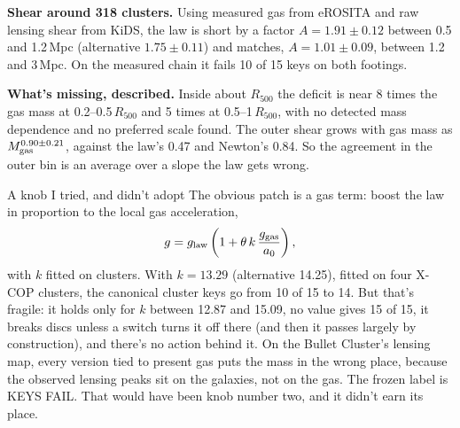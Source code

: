 \textbf{Shear around 318 clusters.} Using measured gas from eROSITA and raw lensing shear from KiDS, the law is short by a factor $A=1.91\pm0.12$ between 0.5 and 1.2\,Mpc (alternative $1.75\pm0.11$) and matches, $A=1.01\pm0.09$, between 1.2 and 3\,Mpc. On the measured chain it fails 10 of 15 keys on both footings.


\textbf{What's missing, described.} Inside about $R_{500}$ the deficit is near 8 times the gas mass at 0.2--0.5\,$R_{500}$ and 5 times at 0.5--1\,$R_{500}$, with no detected mass dependence and no preferred scale found. The outer shear grows with gas mass as $M_{\rm gas}^{0.90\pm0.21}$, against the law's 0.47 and Newton's 0.84. So the agreement in the outer bin is an average over a slope the law gets wrong.







\begin{knobbox}{A knob I tried, and didn't adopt}
The obvious patch is a gas term: boost the law in proportion to the local gas acceleration,
\[
g=g_{\rm law}\left(1+\theta\,k\,\frac{g_{\rm gas}}{a_0}\right),
\]
with $k$ fitted on clusters. With $k=13.29$ (alternative 14.25), fitted on four X-COP clusters, the canonical cluster keys go from 10 of 15 to 14. But that's fragile: it holds only for $k$ between 12.87 and 15.09, no value gives 15 of 15, it breaks discs unless a switch turns it off there (and then it passes largely by construction), and there's no action behind it. On the Bullet Cluster's lensing map, every version tied to present gas puts the mass in the wrong place, because the observed lensing peaks sit on the galaxies, not on the gas. The frozen label is KEYS FAIL. That would have been knob number two, and it didn't earn its place.
\end{knobbox}

